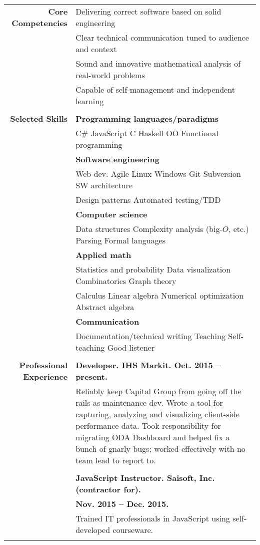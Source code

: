 \documentclass{article}
\newcommand\spc{\hspace{8pt}}
\begin{document}
\bgroup
\begin{tabular}{rl}
  \def\arraystrech{1.5}
  {\bf Core Competencies} & Delivering correct software based on solid engineering \\
   & Clear technical communication tuned to audience and context \\
  & Sound and innovative mathematical analysis of real-world problems \\
  & Capable of self-management and independent learning \\ \\

  {\bf Selected Skills}  & {\bf Programming languages/paradigms} \\
  & C\# \spc JavaScript \spc C \spc Haskell \spc OO \spc Functional programming \\
  & {\bf Software engineering} \\
  & Web dev. \spc Agile \spc Linux \spc Windows \spc Git \spc Subversion \spc SW architecture \\
 & Design patterns \spc Automated testing/TDD \\
    & {\bf Computer science} \\
  & Data structures \spc Complexity analysis (big-$O$, etc.) \spc Parsing \spc Formal languages \\
  & {\bf Applied math} \\
  & Statistics and probability \spc Data visualization \spc Combinatorics \spc Graph theory \\
  & Calculus \spc Linear algebra \spc Numerical optimization \spc Abstract algebra \\
  & {\bf Communication} \\
  & Documentation/technical writing \spc Teaching \spc Self-teaching \spc Good listener \\ \\

  {\bf Professional Experience} & {\bf Developer. IHS Markit. Oct. 2015 -- present.} \\
  & \parbox{4.5in}{Reliably keep Capital Group from going off the rails as maintenance dev. Wrote a tool for capturing, analyzing and visualizing client-side performance data. Took responsibility for migrating ODA Dashboard and helped fix a bunch of gnarly bugs; worked effectively with no team lead to report to.} 

  \\ \\

  & {\bf JavaScript Instructor. Saisoft, Inc. (contractor for).} \\ & {\bf Nov. 2015 -- Dec. 2015.} \\
  & \parbox{4.5in}{Trained IT professionals in JavaScript using self-developed courseware.} \\ \\


\end{tabular}
\end{document}
